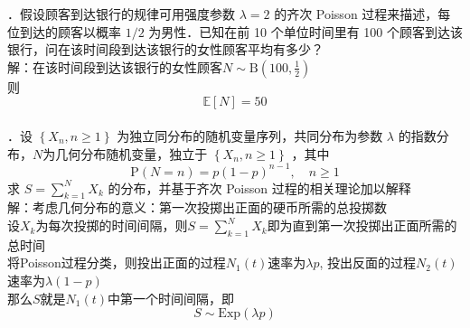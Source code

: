 \documentclass[UTF8,openany]{book}
\begin{document}
．假设顾客到达银行的规律可用强度参数 $\lambda=2$ 的齐次 Poisson 过程来描述，每位到达的顾客以概率 $1 / 2$ 为男性．已知在前 10 个单位时间里有 100 个顾客到达该银行，问在该时间段到达该银行的女性顾客平均有多少？\\
解：在该时间段到达该银行的女性顾客$N\sim \mathrm{B}\left(100,\frac{1}{2} \right) $\\
则
\[
\mathbb{E}[N]=50
\]\\




．设 $\left\{X_{n}, n \geq 1\right\}$ 为独立同分布的随机变量序列，共同分布为参数 $\lambda$ 的指数分布，$N$为几何分布随机变量，独立于 $\left\{X_{n}, n \geq 1\right\}$ ，其中
$$
\mathrm{P}(N=n)=p(1-p)^{n-1}, \quad n \geq 1
$$
求 $S=\sum\limits_{k=1}^{N} X_{k}$ 的分布，并基于齐次 Poisson 过程的相关理论加以解释\\
解：考虑几何分布的意义：第一次投掷出正面的硬币所需的总投掷数\\
设$X_k$为每次投掷的时间间隔，则$S=\sum\limits_{k=1}^N X_k$即为直到第一次投掷出正面所需的总时间\\
将Poisson过程分类，则投出正面的过程$N_1(t)$速率为$\lambda p$,
投出反面的过程$N_2(t)$速率为$\lambda (1-p)$\\
那么$S$就是$N_1(t)$中第一个时间间隔，即
\[
S \sim \mathrm{Exp}(\lambda p)
\]\\
\newpage
\end{document}
